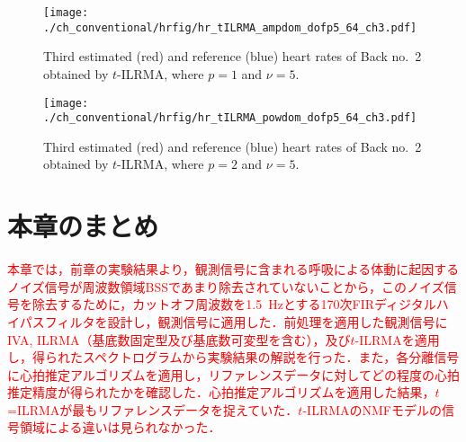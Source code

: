 \begin{figure}[tb]
\centering
\texttt{[image: ./ch\_conventional/hrfig/hr\_tILRMA\_ampdom\_dofp5\_64\_ch3.pdf]}
\caption{Third estimated (red) and reference (blue) heart rates of Back no.~2 obtained by $t$-ILRMA, where $p=1$ and $\nu=5$.}
\label{fig:hrtilrmaa5}
\end{figure}

\begin{figure}[tb]
\centering
\texttt{[image: ./ch\_conventional/hrfig/hr\_tILRMA\_powdom\_dofp5\_64\_ch3.pdf]}
\caption{Third estimated (red) and reference (blue) heart rates of Back no.~2 obtained by $t$-ILRMA, where $p=2$ and $\nu=5$.}
\label{fig:hrtilrmap5}
\end{figure}

\section{本章のまとめ}
\label{sec:conv:conclusion5}
\textcolor{red}{本章では，前章の実験結果より，観測信号に含まれる呼吸による体動に起因するノイズ信号が周波数領域BSSであまり除去されていないことから，このノイズ信号を除去するために，カットオフ周波数を1.5~Hzとする170次FIRディジタルハイパスフィルタを設計し，観測信号に適用した．前処理を適用した観測信号にIVA, ILRMA（基底数固定型及び基底数可変型を含む），及び$t$-ILRMAを適用し，得られたスペクトログラムから実験結果の解説を行った．また，各分離信号に心拍推定アルゴリズムを適用し，リファレンスデータに対してどの程度の心拍推定精度が得られたかを確認した．心拍推定アルゴリズムを適用した結果，$t$=ILRMAが最もリファレンスデータを捉えていた．$t$-ILRMAのNMFモデルの信号領域による違いは見られなかった．}